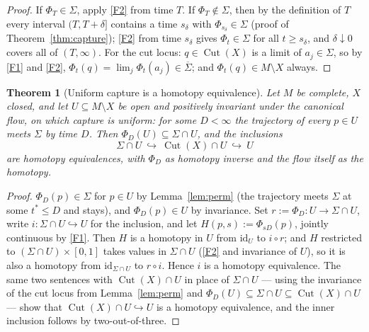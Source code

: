 \documentclass[11pt]{article}
\newtheorem{theorem}{Theorem}[section]
\theoremstyle{remark}
\newcommand{\X}{X}
\newcommand{\Cut}{\operatorname{Cut}}
\begin{document}
\begin{proof}
If $\Phi_{T}\in\Sigma$, apply \ref{F2} from time $T$. If
$\Phi_{T}\notin\Sigma$, then by the definition of $T$ every interval
$(T,T+\delta]$ contains a time $s_{\delta}$ with
$\Phi_{s_{\delta}}\in\Sigma$ (proof of
Theorem~\ref{thm:capture}); \ref{F2} from time $s_{\delta}$ gives
$\Phi_{t}\in\Sigma$ for all $t\ge s_{\delta}$, and
$\delta\downarrow0$ covers all of $(T,\infty)$. For the cut locus:
$q\in\Cut(\X)$ is a limit of $a_{j}\in\Sigma$, so by \ref{F1} and
\ref{F2}, $\Phi_{t}(q)=\lim_{j}\Phi_{t}(a_{j})\in\overline{\Sigma}$;
and $\Phi_{t}(q)\in M\setminus\X$ always.
\end{proof}

\begin{theorem}[Uniform capture is a homotopy equivalence]
\label{thm:homotopy}
Let $M$ be complete, $\X$ closed, and let $U\subseteq M\setminus\X$
be open and positively invariant under the canonical flow, on which
capture is uniform: for some $D<\infty$ the trajectory of every
$p\in U$ meets $\Sigma$ by time $D$. Then
$\Phi_{D}(U)\subseteq\Sigma\cap U$, and the inclusions
\[
  \Sigma\cap U\ \hookrightarrow\ \Cut(\X)\cap U\ \hookrightarrow\ U
\]
are homotopy equivalences, with $\Phi_{D}$ as homotopy inverse and
the flow itself as the homotopy.
\end{theorem}

\begin{proof}
$\Phi_{D}(p)\in\Sigma$ for $p\in U$ by Lemma~\ref{lem:perm} (the
trajectory meets $\Sigma$ at some $t^{*}\le D$ and stays), and
$\Phi_{D}(p)\in U$ by invariance. Set
$r:=\Phi_{D}\colon U\to\Sigma\cap U$, write
$i\colon\Sigma\cap U\hookrightarrow U$ for the inclusion, and let
$H(p,s):=\Phi_{sD}(p)$, jointly continuous by \ref{F1}. Then $H$ is
a homotopy in $U$ from $\mathrm{id}_{U}$ to $i\circ r$; and $H$
restricted to $(\Sigma\cap U)\times[0,1]$ takes values in
$\Sigma\cap U$ (\ref{F2} and invariance of $U$), so it is also a
homotopy from $\mathrm{id}_{\Sigma\cap U}$ to $r\circ i$. Hence $i$
is a homotopy equivalence. The same two sentences with
$\Cut(\X)\cap U$ in place of $\Sigma\cap U$ --- using the
invariance of the cut locus from Lemma~\ref{lem:perm} and
$\Phi_{D}(U)\subseteq\Sigma\cap U\subseteq\Cut(\X)\cap U$ --- show
that $\Cut(\X)\cap U\hookrightarrow U$ is a homotopy equivalence,
and the inner inclusion follows by two-out-of-three.
\end{proof}
\end{document}
